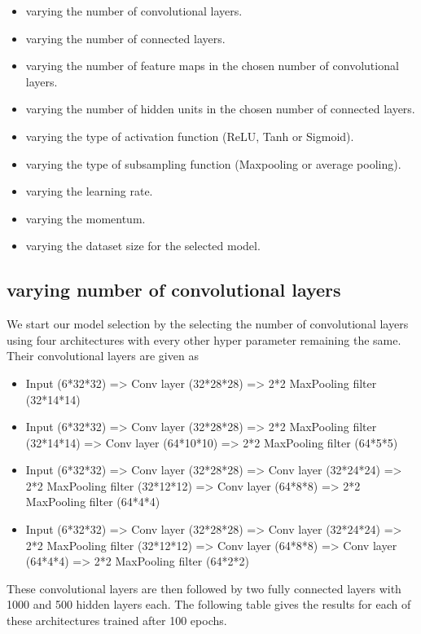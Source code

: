 \begin{itemize}
	\item varying the number of convolutional layers.
	\item varying the number of connected layers.
	\item varying the number of feature maps in the chosen number of convolutional layers.
	\item varying the number of hidden units in the chosen number of connected layers.
	\item varying the type of activation function (ReLU, Tanh or Sigmoid).
	\item varying the type of subsampling function (Maxpooling or average pooling).
	\item varying the learning rate.
	\item varying the momentum.
	\item varying the dataset size for the selected model.
\end{itemize}

\subsection{varying number of convolutional layers}

We start our model selection by the selecting the number of convolutional layers using four architectures with every other hyper parameter remaining the same. Their convolutional layers are given as

\begin{itemize}
	\item Input (6*32*32) => Conv layer (32*28*28) => 2*2 MaxPooling filter (32*14*14) 
	\item Input (6*32*32) => Conv layer (32*28*28) => 2*2 MaxPooling filter (32*14*14) => Conv layer (64*10*10) => 2*2 MaxPooling filter (64*5*5)
	\item Input (6*32*32) => Conv layer (32*28*28) => Conv layer (32*24*24) => 2*2 MaxPooling filter (32*12*12) => Conv layer (64*8*8) => 2*2 MaxPooling filter (64*4*4)
	\item Input (6*32*32) => Conv layer (32*28*28) => Conv layer (32*24*24) => 2*2 MaxPooling filter (32*12*12) => Conv layer (64*8*8) => Conv layer (64*4*4) => 2*2 MaxPooling filter (64*2*2)
\end{itemize}

These convolutional layers are then followed by two fully connected layers with 1000 and 500 hidden layers each. The following table gives the results for each of these architectures trained after 100 epochs.\\

